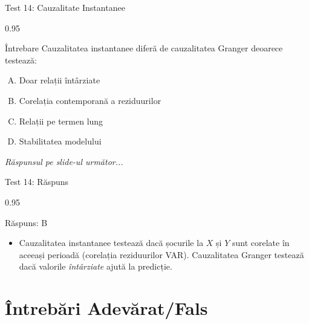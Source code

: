 \documentclass[9pt, aspectratio=169, t]{beamer}
\begin{document}
\begin{frame}{Test 14: Cauzalitate Instantanee}
    \begin{cminipage}{0.95\textwidth}
    \begin{alertblock}{Întrebare}
        Cauzalitatea instantanee diferă de cauzalitatea Granger deoarece testează:
    \end{alertblock}

    \vspace{0.3cm}

    \begin{enumerate}[A)]\setlength{\itemsep}{0pt}
        \item Doar relații întârziate
        \item Corelația contemporană a reziduurilor
        \item Relații pe termen lung
        \item Stabilitatea modelului
    \end{enumerate}

    \vspace{0.5cm}
    \begin{flushright}\textit{Răspunsul pe slide-ul următor...}\end{flushright}
    \end{cminipage}
\end{frame}

\begin{frame}{Test 14: Răspuns}
    \begin{cminipage}{0.95\textwidth}
    \begin{exampleblock}{Răspuns: B}
        \begin{itemize}\setlength{\itemsep}{0pt}
            \item Cauzalitatea instantanee testează dacă șocurile la $X$ și $Y$ sunt corelate în aceeași perioadă (corelația reziduurilor VAR). Cauzalitatea Granger testează dacă valorile \textit{întârziate} ajută la predicție.
        \end{itemize}
    \end{exampleblock}
    \end{cminipage}
\end{frame}

\section{Întrebări Adevărat/Fals}
\end{document}

